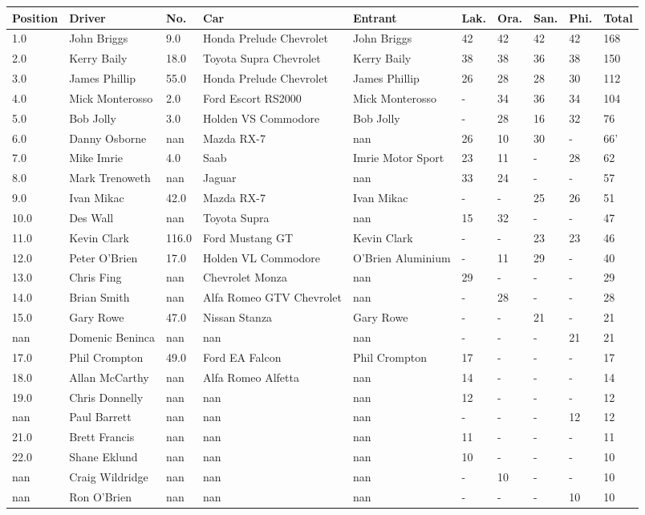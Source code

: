 \documentclass{article}
\begin{document}
\begin{tabular}{llllllllll}
\toprule
Position & Driver & No. & Car & Entrant & Lak. & Ora. & San. & Phi. & Total \\
\midrule
1.0 & John Briggs & 9.0 & Honda Prelude Chevrolet & John Briggs & 42 & 42 & 42 & 42 & 168 \\
2.0 & Kerry Baily & 18.0 & Toyota Supra Chevrolet & Kerry Baily & 38 & 38 & 36 & 38 & 150 \\
3.0 & James Phillip & 55.0 & Honda Prelude Chevrolet & James Phillip & 26 & 28 & 28 & 30 & 112 \\
4.0 & Mick Monterosso & 2.0 & Ford Escort RS2000 & Mick Monterosso & - & 34 & 36 & 34 & 104 \\
5.0 & Bob Jolly & 3.0 & Holden VS Commodore & Bob Jolly & - & 28 & 16 & 32 & 76 \\
6.0 & Danny Osborne & nan & Mazda RX-7 & nan & 26 & 10 & 30 & - & 66' \\
7.0 & Mike Imrie & 4.0 & Saab & Imrie Motor Sport & 23 & 11 & - & 28 & 62 \\
8.0 & Mark Trenoweth & nan & Jaguar & nan & 33 & 24 & - & - & 57 \\
9.0 & Ivan Mikac & 42.0 & Mazda RX-7 & Ivan Mikac & - & - & 25 & 26 & 51 \\
10.0 & Des Wall & nan & Toyota Supra & nan & 15 & 32 & - & - & 47 \\
11.0 & Kevin Clark & 116.0 & Ford Mustang GT & Kevin Clark & - & - & 23 & 23 & 46 \\
12.0 & Peter O'Brien & 17.0 & Holden VL Commodore & O'Brien Aluminium & - & 11 & 29 & - & 40 \\
13.0 & Chris Fing & nan & Chevrolet Monza & nan & 29 & - & - & - & 29 \\
14.0 & Brian Smith & nan & Alfa Romeo GTV Chevrolet & nan & - & 28 & - & - & 28 \\
15.0 & Gary Rowe & 47.0 & Nissan Stanza & Gary Rowe & - & - & 21 & - & 21 \\
nan & Domenic Beninca & nan & nan & nan & - & - & - & 21 & 21 \\
17.0 & Phil Crompton & 49.0 & Ford EA Falcon & Phil Crompton & 17 & - & - & - & 17 \\
18.0 & Allan McCarthy & nan & Alfa Romeo Alfetta & nan & 14 & - & - & - & 14 \\
19.0 & Chris Donnelly & nan & nan & nan & 12 & - & - & - & 12 \\
nan & Paul Barrett & nan & nan & nan & - & - & - & 12 & 12 \\
21.0 & Brett Francis & nan & nan & nan & 11 & - & - & - & 11 \\
22.0 & Shane Eklund & nan & nan & nan & 10 & - & - & - & 10 \\
nan & Craig Wildridge & nan & nan & nan & - & 10 & - & - & 10 \\
nan & Ron O'Brien & nan & nan & nan & - & - & - & 10 & 10 \\
\bottomrule
\end{tabular}
\end{document}

